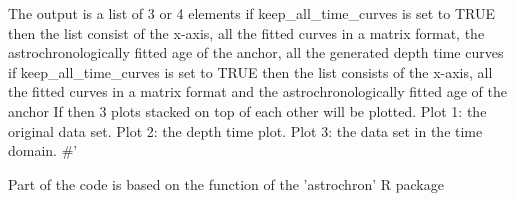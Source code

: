 \documentclass[a4paper]{book}
\begin{document}
%
\begin{Value}
The output is a list of 3 or 4 elements
if keep\_all\_time\_curves is set to TRUE
then the list consist of the x-axis, all the fitted curves in a matrix format,
the astrochronologically fitted age of the anchor, all the generated depth time curves
if keep\_all\_time\_curves is set to TRUE then the list consists of the x-axis,
all the fitted curves in a matrix format and the astrochronologically fitted age of the anchor
If  then 3 plots stacked on top of each other will be plotted.
Plot 1: the original data set.
Plot 2: the depth time plot.
Plot 3: the data set in the time domain.
\#'
\end{Value}
%
\begin{Author}
Part of the code is based on the 
function of the 'astrochron' R package
\end{Author}
%
\end{document}
